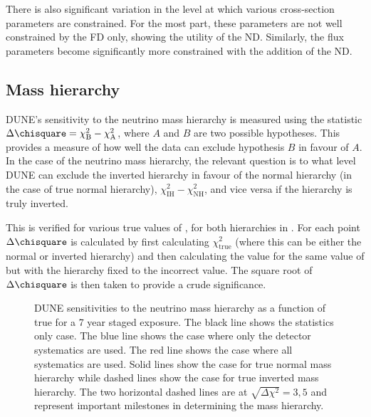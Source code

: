 There is also significant variation in the level at which various cross-section parameters are constrained. 
For the most part, these parameters are not well constrained by the FD only, showing the utility of the ND.
Similarly, the flux parameters become significantly more constrained with the addition of the ND.

\subsection{Mass hierarchy}
\label{sec:dune_lbl:sensitivities:mh}

DUNE's sensitivity to the neutrino mass hierarchy is measured using the statistic $\Delta \chisquare = \chi^{2}_{\text{B}} - \chi^{2}_{\text{A}}$, where $A$ and $B$ are two possible hypotheses.
This provides a measure of how well the data can exclude hypothesis $B$ in favour of $A$.
In the case of the neutrino mass hierarchy, the relevant question is to what level DUNE can exclude the inverted hierarchy in favour of the normal hierarchy (in the case of true normal hierarchy), $\chi^{2}_{\text{IH}} - \chi^{2}_{\text{NH}}$, and vice versa if the hierarchy is truly inverted.

This is verified for various true values of \dcp, for both hierarchies in .
For each \dcp point $\Delta \chisquare$ is calculated by first calculating $\chi^{2}_{\text{true}}$ (where this can be either the normal or inverted hierarchy) and then calculating the \chisquare value for the same value of \dcp but with the hierarchy fixed to the incorrect value.
The square root of $\Delta \chisquare$ is then taken to provide a crude significance.

\begin{figure}[h]
	\begin{adjustbox}{max totalsize=.6\linewidth, center}
		
	\end{adjustbox}
	\caption[DUNE sensitivity to the neutrino mass hierarchy as a function of true \dcp.]{DUNE sensitivities to the neutrino mass hierarchy as a function of true \dcp for a 7 year staged exposure. The black line shows the statistics only case. The blue line shows the case where only the detector systematics are used. The red line shows the case where all systematics are used. Solid lines show the case for true normal mass hierarchy while dashed lines show the case for true inverted mass hierarchy. The two horizontal dashed lines are at $\sqrt{\Delta\chi^{2}} = 3, 5$ and represent important milestones in determining the mass hierarchy.}
	\label{fig:mhSens}
\end{figure}

